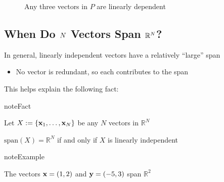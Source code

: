 \documentclass[letterpaper,10pt,english]{jupyterBook}
\begin{document}
\begin{figure}[htbp]
\centering
\capstart

\noindent{}
\caption{Any three vectors in \(P\) are linearly dependent}\label{\detokenize{05.linear_algebra:id9}}\end{figure}


\subsection{When Do \protect\(N\protect\) Vectors Span \protect\(\mathbb{R}^N\protect\)?}
\label{\detokenize{05.linear_algebra:when-do-n-vectors-span-mathbb-r-n}}
\sphinxAtStartPar
In general, linearly independent vectors have a relatively “large” span
\begin{itemize}
\item {} 
\sphinxAtStartPar
No vector is redundant, so each contributes to the span

\end{itemize}

\sphinxAtStartPar
This helps explain the following fact:

\begin{sphinxadmonition}{note}{Fact}

\sphinxAtStartPar
Let \(X := \{ {\bf x}_1, \ldots, {\bf x}_N \}\) be any \(N\) vectors in \(\mathbb{R}^N\)

\sphinxAtStartPar
\(\mathrm{span}(X) = \mathbb{R}^N\) if and only if \(X\) is linearly independent
\end{sphinxadmonition}

\begin{sphinxadmonition}{note}{Example}

\sphinxAtStartPar
The vectors \({\bf x} = (1, 2)\) and \({\bf y} = (-5, 3)\) span \(\mathbb{R}^2\)
\end{sphinxadmonition}
\end{document}
